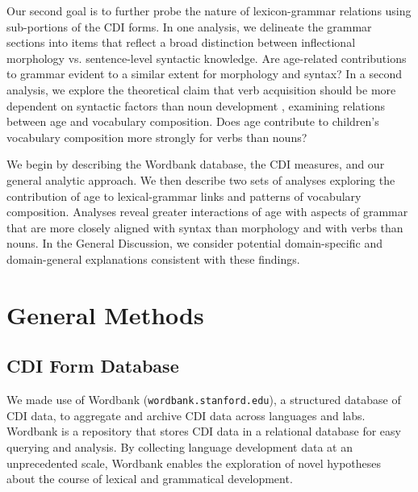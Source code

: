 \documentclass[10pt,letterpaper]{article}
\begin{document}
Our second goal is to further probe the nature of lexicon-grammar relations using sub-portions of the CDI forms. In one analysis, we delineate the grammar sections into items that reflect a broad distinction between inflectional morphology vs. sentence-level syntactic knowledge. Are age-related contributions to grammar evident to a similar extent for morphology and syntax?  In a second analysis, we explore the theoretical claim that verb acquisition should be more dependent on syntactic factors than noun development \cite{gleitman1990}, examining relations between age and vocabulary composition. Does age contribute to children's vocabulary composition more strongly for verbs than nouns? 



We begin by describing the Wordbank database, the CDI measures, and our general analytic approach. We then describe two sets of analyses exploring the contribution of age to lexical-grammar links and patterns of vocabulary composition.  Analyses reveal greater interactions of age with aspects of grammar that are more closely aligned with syntax than morphology and with verbs than nouns. In the General Discussion, we consider potential domain-specific and domain-general explanations consistent with these findings. 

\section{General Methods}

\subsection{CDI Form Database}

We made use of Wordbank (\texttt{wordbank.stanford.edu}), a structured database of CDI data, to aggregate and archive CDI data across languages and labs. Wordbank is a repository that stores CDI data in a relational database for easy querying and analysis. By collecting language development data at an unprecedented scale, Wordbank enables the exploration of novel hypotheses about the course of lexical and grammatical development. 
\end{document}

